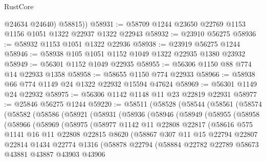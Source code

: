 \begin{lexlean}{RustCore}
\begin{coremodule}
          @24634
          @24640)
        @58815))
@58931 := @58709 @1244 @23650 @22769 @1153 @1156 @1051 @1322 @22937 @1322 @22943
@58932 := @23910 @56275
@58936 := @58932 @1153 @1051 @1322 @22936
@58938 := @23919 @56275 @1244
@58946 := @58938 @105 @1051 @1152 @1049 @1322 @22935 @1380 @23932
@58949 := @56301 @1152 @1049 @22935
@58955 := @56306 @1150 @88 @774 @14 @22933 @1358
@58958 := @58655 @1150 @774 @22933
@58966 := @58938 @66 @774 @1149 @24 @1322 @22932 @15594 @47624
@58969 := @56301 @1149 @24 @22932
@58975 := @56306 @1142 @1148 @11 @23 @22819 @22931
@58977 := @25846 @56275 @1244
@59220 := @58511
    (@58528
      (@58544
        (@58561
          (@58574
            (@58582
              (@58586
                (@58921
                  (@58931
                    (@58936
                      (@58946
                        (@58949
                          (@58955
                            (@58958
                              (@58966
                                (@58969
                                  (@58975
                                    (@58977
                                      @1142
                                      @11
                                      @22808
                                      @22817
                                      (@58616
                                        @575
                                        @1141
                                        @16
                                        @11
                                        @22808
                                        @22815
                                        @8620
                                        (@58867
                                          @307
                                          @11
                                          @15
                                          @22794
                                          @22807
                                          @22814
                                          @1434
                                          @22774
                                          @1316
                                          (@58878
                                            @22794
                                            (@58884
                                              @22782
                                              @22789
                                              @58673
                                              @43881
                                              @43887
                                              @43903
                                              @43906

\end{coremodule}
\end{lexlean}
